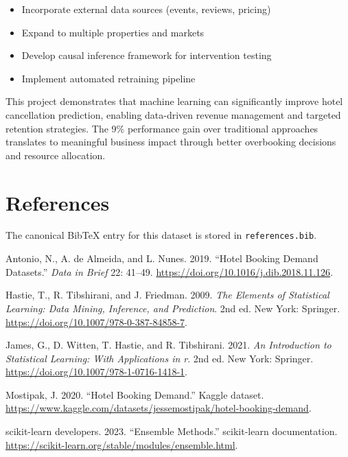 \documentclass[
  letterpaper,
  DIV=11,
  numbers=noendperiod]{scrartcl}
\newlength{\cslhangindent}
\newenvironment{CSLReferences}[2] %
 {\begin{list}{}{%
  \setlength{\itemindent}{0pt}
  \setlength{\leftmargin}{0pt}
  \setlength{\parsep}{0pt}
  \ifodd #1
   \setlength{\leftmargin}{\cslhangindent}
   \setlength{\itemindent}{-1\cslhangindent}
  \fi
  \setlength{\itemsep}{#2\baselineskip}}}
 {\end{list}}
\providecommand{\tightlist}{%
  \setlength{\itemsep}{0pt}\setlength{\parskip}{0pt}}
\begin{document}
\begin{itemize}
\tightlist
\item
  Incorporate external data sources (events, reviews, pricing)
\item
  Expand to multiple properties and markets
\item
  Develop causal inference framework for intervention testing
\item
  Implement automated retraining pipeline
\end{itemize}

This project demonstrates that machine learning can significantly
improve hotel cancellation prediction, enabling data-driven revenue
management and targeted retention strategies. The 9\% performance gain
over traditional approaches translates to meaningful business impact
through better overbooking decisions and resource allocation.

\section{References}\label{references}

The canonical BibTeX entry for this dataset is stored in
\texttt{references.bib}.

\label{refs}
\begin{CSLReferences}{1}{0}
Antonio, N., A. de Almeida, and L. Nunes. 2019. {``Hotel Booking Demand
Datasets.''} \emph{Data in Brief} 22: 41--49.
\url{https://doi.org/10.1016/j.dib.2018.11.126}.

Hastie, T., R. Tibshirani, and J. Friedman. 2009. \emph{The Elements of
Statistical Learning: Data Mining, Inference, and Prediction}. 2nd ed.
New York: Springer. \url{https://doi.org/10.1007/978-0-387-84858-7}.

James, G., D. Witten, T. Hastie, and R. Tibshirani. 2021. \emph{An
Introduction to Statistical Learning: With Applications in r}. 2nd ed.
New York: Springer. \url{https://doi.org/10.1007/978-1-0716-1418-1}.

Mostipak, J. 2020. {``Hotel Booking Demand.''} Kaggle dataset.
\url{https://www.kaggle.com/datasets/jessemostipak/hotel-booking-demand}.

scikit-learn developers. 2023. {``Ensemble Methods.''} scikit-learn
documentation.
\url{https://scikit-learn.org/stable/modules/ensemble.html}.

\end{CSLReferences}
\end{document}
